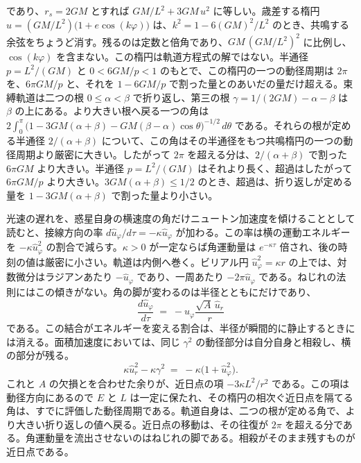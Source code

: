 \documentclass[a4paper]{article}
\begin{document}
であり、\(r_{s}=2GM\) とすれば \(GM/L^{2}+3GM\,u^{2}\) に等しい。歳差する楕円 \(u=(GM/L^{2})\bigl(1+e\cos(k\varphi)\bigr)\) は、\(k^{2}=1-6(GM)^{2}/L^{2}\) のとき、共鳴する余弦をちょうど消す。残るのは定数と倍角であり、\(GM\,(GM/L^{2})^{2}\) に比例し、\(\cos(k\varphi)\) を含まない。この楕円は軌道方程式の解ではない。半通径 \(p=L^{2}/(GM)\) と \(0<6GM/p<1\) のもとで、この楕円の一つの動径周期は \(2\pi\) を、\(6\pi GM/p\) と、それを \(1-6GM/p\) で割った量とのあいだの量だけ超える。束縛軌道は二つの根 \(0\le\alpha<\beta\) で折り返し、第三の根 \(\gamma=1/(2GM)-\alpha-\beta\) は \(\beta\) の上にある。より大きい根へ戻る一つの角は \(2\int_{0}^{\pi}\bigl(1-3GM(\alpha+\beta)-GM(\beta-\alpha)\cos\theta\bigr)^{-1/2}\,d\theta\) である。それらの根が定める半通径 \(2/(\alpha+\beta)\) について、この角はその半通径をもつ共鳴楕円の一つの動径周期より厳密に大きい。したがって \(2\pi\) を超える分は、\(2/(\alpha+\beta)\) で割った \(6\pi GM\) より大きい。半通径 \(p=L^{2}/(GM)\) はそれより長く、超過はしたがって \(6\pi GM/p\) より大きい。\(3GM(\alpha+\beta)\le 1/2\) のとき、超過は、折り返しが定める量を \(1-3GM(\alpha+\beta)\) で割った量より小さい。

光速の遅れを、惑星自身の横速度の角だけニュートン加速度を傾けることとして読むと、接線方向の率 \(d\hat{u}_{\varphi}/d\tau=-\kappa\hat{u}_{\varphi}\) が加わる。この率は横の運動エネルギーを \(-\kappa\hat{u}_{\varphi}^{2}\) の割合で減らす。\(\kappa>0\) が一定ならば角運動量は \(e^{-\kappa\tau}\) 倍され、後の時刻の値は厳密に小さい。軌道は内側へ巻く。ビリアル円 \(\hat{u}_{\varphi}^{2}=\kappa r\) の上では、対数微分はラジアンあたり \(-\hat{u}_{\varphi}\) であり、一周あたり \(-2\pi\hat{u}_{\varphi}\) である。ねじれの法則にはこの傾きがない。角の脚が変わるのは半径とともにだけであり、
\begin{equation}
\frac{d\hat{u}_{\varphi}}{d\tau} \;=\; -\hat{u}_{\varphi}\frac{\sqrt{A}\,\hat{u}_{r}}{r}
\label{eq:angular-leg}
\end{equation}
である。この結合がエネルギーを変える割合は、半径が瞬間的に静止するときには消える。面積加速度においては、同じ \(\gamma^{2}\) の動径部分は自分自身と相殺し、横の部分が残る。
\begin{equation}
\kappa\hat{u}_{r}^{2}-\kappa\gamma^{2} \;=\; -\kappa\bigl(1+\hat{u}_{\varphi}^{2}\bigr).
\label{eq:radial-cancels}
\end{equation}
これと \(A\) の欠損とを合わせた余りが、近日点の項 \(-3\kappa L^{2}/r^{2}\) である。この項は動径方向にあるので \(E\) と \(L\) は一定に保たれ、その楕円の相次ぐ近日点を隔てる角は、すでに評価した動径周期である。軌道自身は、二つの根が定める角で、より大きい折り返しの値へ戻る。近日点の移動は、その往復が \(2\pi\) を超える分である。角運動量を流出させないのはねじれの脚である。相殺がそのまま残すものが近日点である。
\end{document}
